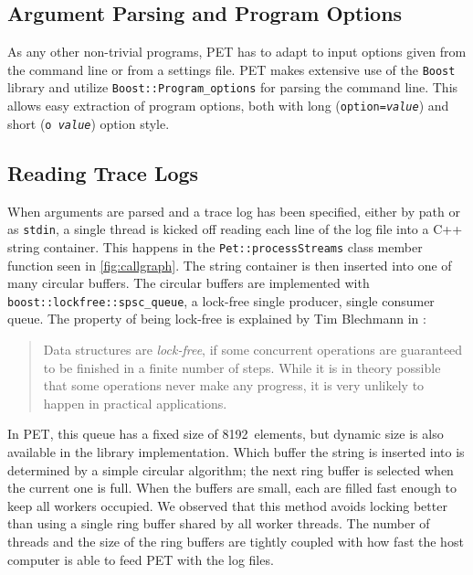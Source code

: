 \subsection{Argument Parsing and Program Options}

As any other non-trivial programs, PET has to adapt to input options given from
the command line or from a settings file. PET makes extensive use of the
\texttt{Boost} library and utilize \texttt{Boost::Program\_options} for parsing
the command line. This allows easy extraction of program options, both with long
(\texttt{\textemdash \textemdash option=\emph{value}}) and short
(\texttt{\textemdash o~\emph{value}}) option style.


\subsection{Reading Trace Logs}

When arguments are parsed and a trace log has been specified, either by path or
as \texttt{stdin}, a single thread is kicked off reading each line of the log
file into a C++ string container. This happens in the
\texttt{Pet::processStreams} class member function seen in \autoref{fig:callgraph}. The string
container is then inserted into one of many circular buffers. The circular
buffers are implemented with \texttt{boost::lockfree::spsc\_queue}, a lock-free
single producer, single consumer queue. The property of being lock-free is
explained by Tim Blechmann in \cite{boostlockfree}:

\begin{quote}
    Data structures are \emph{lock-free}, if some concurrent operations
are guaranteed to be finished in a finite number of steps. While it is in theory
possible that some operations never make any progress, it is very unlikely to
happen in practical applications.
\end{quote}

In PET, this queue has a fixed size of 8192~elements, but dynamic size is also
available in the library implementation. Which buffer the string is inserted
into is determined by a simple circular algorithm; the next ring buffer is
selected when the current one is full. When the buffers are small, each are
filled fast enough to keep all workers occupied. We observed that this method
avoids locking better than using a single ring buffer shared by all worker
threads. The number of threads and the size of the ring buffers are tightly
coupled with how fast the host computer is able to feed PET with the log files.


